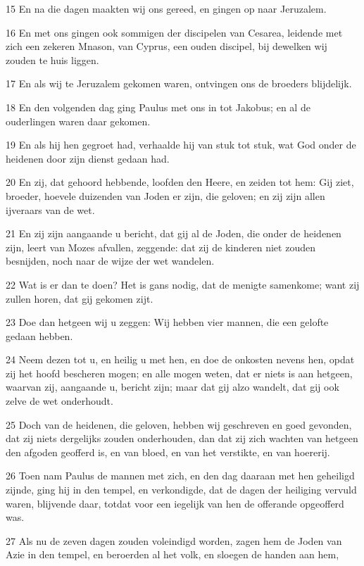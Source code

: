 \par 15 En na die dagen maakten wij ons gereed, en gingen op naar Jeruzalem.
\par 16 En met ons gingen ook sommigen der discipelen van Cesarea, leidende met zich een zekeren Mnason, van Cyprus, een ouden discipel, bij dewelken wij zouden te huis liggen.
\par 17 En als wij te Jeruzalem gekomen waren, ontvingen ons de broeders blijdelijk.
\par 18 En den volgenden dag ging Paulus met ons in tot Jakobus; en al de ouderlingen waren daar gekomen.
\par 19 En als hij hen gegroet had, verhaalde hij van stuk tot stuk, wat God onder de heidenen door zijn dienst gedaan had.
\par 20 En zij, dat gehoord hebbende, loofden den Heere, en zeiden tot hem: Gij ziet, broeder, hoevele duizenden van Joden er zijn, die geloven; en zij zijn allen ijveraars van de wet.
\par 21 En zij zijn aangaande u bericht, dat gij al de Joden, die onder de heidenen zijn, leert van Mozes afvallen, zeggende: dat zij de kinderen niet zouden besnijden, noch naar de wijze der wet wandelen.
\par 22 Wat is er dan te doen? Het is gans nodig, dat de menigte samenkome; want zij zullen horen, dat gij gekomen zijt.
\par 23 Doe dan hetgeen wij u zeggen: Wij hebben vier mannen, die een gelofte gedaan hebben.
\par 24 Neem dezen tot u, en heilig u met hen, en doe de onkosten nevens hen, opdat zij het hoofd bescheren mogen; en alle mogen weten, dat er niets is aan hetgeen, waarvan zij, aangaande u, bericht zijn; maar dat gij alzo wandelt, dat gij ook zelve de wet onderhoudt.
\par 25 Doch van de heidenen, die geloven, hebben wij geschreven en goed gevonden, dat zij niets dergelijks zouden onderhouden, dan dat zij zich wachten van hetgeen den afgoden geofferd is, en van bloed, en van het verstikte, en van hoererij.
\par 26 Toen nam Paulus de mannen met zich, en den dag daaraan met hen geheiligd zijnde, ging hij in den tempel, en verkondigde, dat de dagen der heiliging vervuld waren, blijvende daar, totdat voor een iegelijk van hen de offerande opgeofferd was.
\par 27 Als nu de zeven dagen zouden voleindigd worden, zagen hem de Joden van Azie in den tempel, en beroerden al het volk, en sloegen de handen aan hem,
